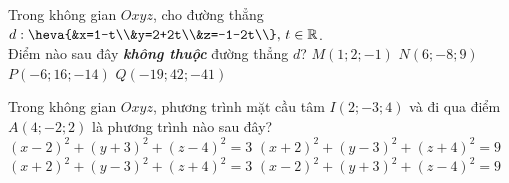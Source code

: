\begin{ex}%
	Trong không gian $ Oxyz $, cho đường thẳng $ d:\heva{&x=1-t\\&y=2+2t\\&z=-1-2t\\}, \, t \in \mathbb{R} $.\\ Điểm nào sau đây \textbf{\textit{không thuộc}} đường thẳng $d$?
	\choice
	{$ M(1;2;-1) $}
	{$ N(6;-8;9) $}
	{\True $ P(-6;16;-14) $}
	{$ Q(-19;42;-41) $}
\end{ex}
\begin{ex}%
	Trong không gian $ Oxyz $, phương trình mặt cầu tâm $ I(2;-3;4) $ và đi qua điểm $ A(4;-2;2) $ là phương trình nào sau đây?
	\choice
	{$ (x-2)^2+(y+3)^2+(z-4)^2=3 $}
	{$ (x+2)^2+(y-3)^2+(z+4)^2=9 $}
	{$ (x+2)^2+(y-3)^2+(z+4)^2=3 $}
	{\True $ (x-2)^2+(y+3)^2+(z-4)^2=9 $}
\end{ex}
